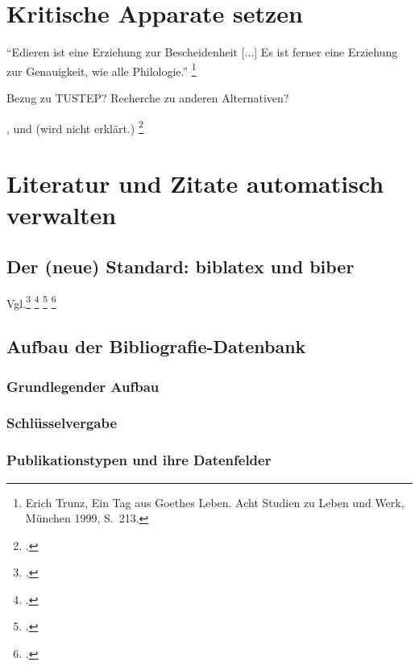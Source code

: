 \chapter{Kritische Apparate setzen}

 
\label{reledmac}

\enquote{Edieren ist eine Erziehung zur Bescheidenheit [...] Es ist ferner eine Erziehung zur 
Genauigkeit, wie alle Philologie.}%
\footnote{Erich Trunz, Ein Tag aus Goethes Leben. Acht Studien zu Leben und Werk, München 1999, S.~213.}

Bezug zu TUSTEP?
Recherche zu anderen Alternativen?

,  und  (wird nicht erklärt.)
\footcite[165\psqq]{rouquette:2012}


\chapter{Literatur und Zitate automatisch verwalten}
\label{biblatex}


\section{Der (neue) Standard: biblatex und biber}

Vgl.\footcite[79\psqq]{rouquette:2012}
\footcite{voss:bibliografien}
\footcite{wassenhoven:dtk2008/2}
\footcite{wassenhoven:dtk2008/4}



\section{Aufbau der Bibliografie-Datenbank}

\subsection{Grundlegender Aufbau}

\subsection{Schlüsselvergabe}

\subsection{Publikationstypen und ihre Datenfelder}

